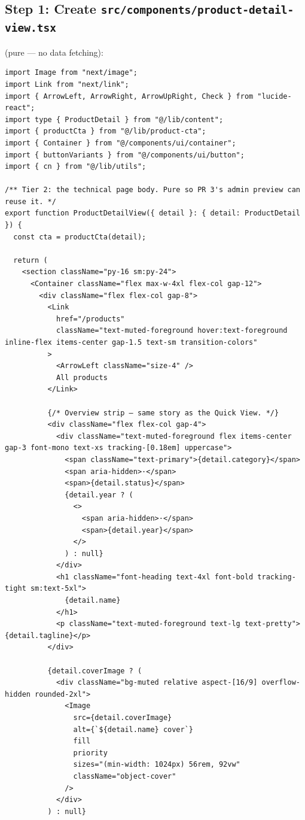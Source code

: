 \documentclass[11pt,a4paper]{article}
\begin{document}
\subsection*{Step 1: Create \texttt{src/components/product-detail-view.tsx}}

(pure --- no data fetching):

\begin{lstlisting}
import Image from "next/image";
import Link from "next/link";
import { ArrowLeft, ArrowRight, ArrowUpRight, Check } from "lucide-react";
import type { ProductDetail } from "@/lib/content";
import { productCta } from "@/lib/product-cta";
import { Container } from "@/components/ui/container";
import { buttonVariants } from "@/components/ui/button";
import { cn } from "@/lib/utils";

/** Tier 2: the technical page body. Pure so PR 3's admin preview can reuse it. */
export function ProductDetailView({ detail }: { detail: ProductDetail }) {
  const cta = productCta(detail);

  return (
    <section className="py-16 sm:py-24">
      <Container className="flex max-w-4xl flex-col gap-12">
        <div className="flex flex-col gap-8">
          <Link
            href="/products"
            className="text-muted-foreground hover:text-foreground inline-flex items-center gap-1.5 text-sm transition-colors"
          >
            <ArrowLeft className="size-4" />
            All products
          </Link>

          {/* Overview strip — same story as the Quick View. */}
          <div className="flex flex-col gap-4">
            <div className="text-muted-foreground flex items-center gap-3 font-mono text-xs tracking-[0.18em] uppercase">
              <span className="text-primary">{detail.category}</span>
              <span aria-hidden>·</span>
              <span>{detail.status}</span>
              {detail.year ? (
                <>
                  <span aria-hidden>·</span>
                  <span>{detail.year}</span>
                </>
              ) : null}
            </div>
            <h1 className="font-heading text-4xl font-bold tracking-tight sm:text-5xl">
              {detail.name}
            </h1>
            <p className="text-muted-foreground text-lg text-pretty">{detail.tagline}</p>
          </div>

          {detail.coverImage ? (
            <div className="bg-muted relative aspect-[16/9] overflow-hidden rounded-2xl">
              <Image
                src={detail.coverImage}
                alt={`${detail.name} cover`}
                fill
                priority
                sizes="(min-width: 1024px) 56rem, 92vw"
                className="object-cover"
              />
            </div>
          ) : null}


\end{lstlisting}
\end{document}
